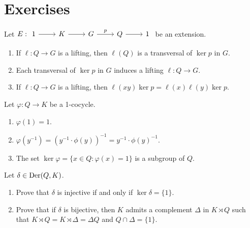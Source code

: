 \section*{Exercises}

\begin{prob}
	\label{xca:lifting}
	Let $E:
	\begin{tikzcd}
	1 & K & G & Q & 1
	\arrow[from=1-1, to=1-2]
	\arrow[from=1-2, to=1-3]
	\arrow["p", from=1-3, to=1-4]
	\arrow[from=1-4, to=1-5]
    \end{tikzcd}$
	be an extension. 
	\begin{enumerate}
		\item If $\ell\colon Q\to G$ is a lifting, then $\ell(Q)$
			is a transversal of $\ker p$ in $G$.
		\item Each transversal of $\ker p$ in $G$ induces a lifting $\ell\colon
			Q\to G$.
		\item If $\ell\colon Q\to G$ is a lifting, then 
			$\ell(xy)\ker p=\ell(x)\ell(y)\ker p$.
	\end{enumerate}
\end{prob}

\begin{prob}
	\label{xca:1cocycle}
	Let $\varphi\colon Q\to K$ be a 1-cocycle. 
	\begin{enumerate}
		\item $\varphi(1)=1$.
		\item $\varphi(y^{-1})=(y^{-1}\cdot\phi(y))^{-1}=y^{-1}\cdot\phi(y)^{-1}$.
		\item The set $\ker\varphi=\{x\in Q:\varphi(x)=1\}$ is a subgroup of $Q$. 
	\end{enumerate}
\end{prob}

\begin{prob}
	\label{xca:ker1cocycle}
	Let $\delta\in\operatorname{Der}(Q,K)$. 
	\begin{enumerate}
	\item Prove that $\delta$ is injective if and only if 
	$\ker\delta=\{1\}$.
	\item Prove that if $\delta$ is bijective, then  
	$K$ admits a complement 
	$\Delta$ in $K\rtimes Q$ such that $K\rtimes Q=K\rtimes\Delta=\Delta Q$ and 
	$Q\cap\Delta=\{1\}$.
	\end{enumerate}
\end{prob}


